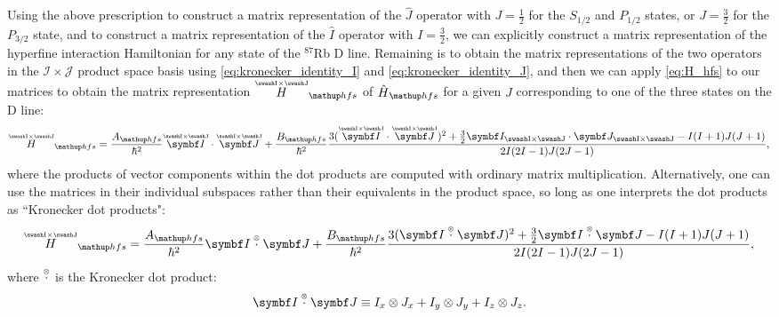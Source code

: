 Using the above prescription to construct a matrix representation of the $\hat J$ operator with $J=\frac12$ for the $S_{1/2}$ and $P_{1/2}$ states, or $J=\frac32$ for the $P_{3/2}$ state, and to construct a matrix representation of the $\hat I$ operator with $I=\frac32$, we can explicitly construct a matrix representation of the hyperfine interaction Hamiltonian for any state of the $^{87}$Rb D line. Remaining is to obtain the matrix representations of the two operators in the $\mathcal{I}\times\mathcal{J}$ product space basis using \eqref{eq:kronecker_identity_I} and \eqref{eq:kronecker_identity_J}, and then we can apply \eqref{eq:H_hfs} to our matrices to obtain the matrix representation $\overset{\scriptscriptstyle{\mathcal{I}\times\mathcal{J}}}H_\up{hfs}$ of $\hat H_\up{hfs}$ for a given $J$ corresponding to one of the three states on the D line:
\begin{align}\label{eq:H_hfs_matrix}
\overset{\scriptscriptstyle{\mathcal{I}\times\mathcal{J}}}H_\up{hfs} = \frac{A_\up{hfs}}{\hbar^2}
\overset{\scriptscriptstyle{\mathcal{I}\times\mathcal{J}}}{\vec I} \cdot
\overset{\scriptscriptstyle{\mathcal{I}\times\mathcal{J}}}{\vec J}
+ \frac{B_\up{hfs}}{\hbar^2}\frac
{3(\overset{\scriptscriptstyle{\mathcal{I}\times\mathcal{J}}}{\vec I}\cdot
\overset{\scriptscriptstyle{\mathcal{I}\times\mathcal{J}}}{\vec J})^2
+ \frac32 \vec I_{\mathcal{I}\times\mathcal{J}}\cdot
\vec J_{\mathcal{I}\times\mathcal{J}}
 - I(I + 1)J(J + 1)}
{2I(2I - 1)J(2J - 1)},
\end{align}
where the products of vector components within the dot products are computed with ordinary matrix multiplication. Alternatively, one can use the matrices in their individual subspaces rather than their equivalents in the product space, so long as one interprets the dot products as ``Kronecker dot products":
\begin{align}\label{eq:H_hfs_matrix_kron}
\overset{\scriptscriptstyle{\mathcal{I}\times\mathcal{J}}}H_\up{hfs} = \frac{A_\up{hfs}}{\hbar^2}
\vec I \krondot \vec J
+ \frac{B_\up{hfs}}{\hbar^2}\frac
{3(\vec I \krondot \vec J)^2
+ \frac32 \vec I \krondot \vec J
 - I(I + 1)J(J + 1)}
{2I(2I - 1)J(2J - 1)},
\end{align}
where $\overset{\scriptscriptstyle\otimes}\cdot$ is the Kronecker dot product:
\begin{align}
\vec I \krondot \vec J \equiv I_x \otimes J_x + I_y \otimes J_y + I_z \otimes J_z.
\end{align}

